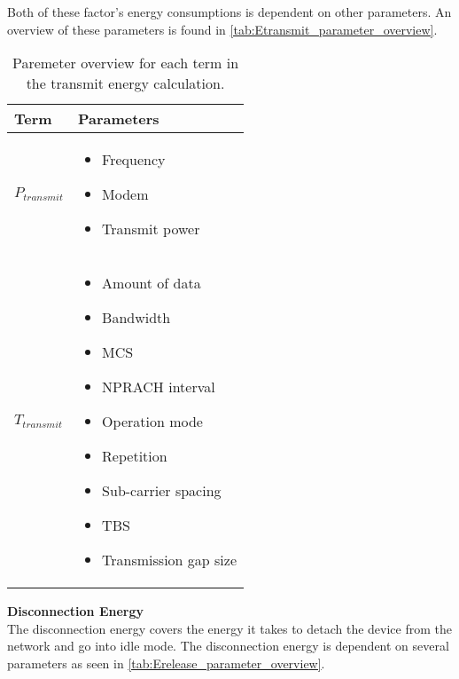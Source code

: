 Both of these factor's energy consumptions is dependent on other parameters. An overview of these parameters is found in \autoref{tab:Etransmit_parameter_overview}.

\begin{table}[H]
\centering
\begin{tabular}{|m{3cm}|m{6cm}|} \hline
\textbf{Term} & \textbf{Parameters} \\ \hline
$P_{transmit}$ & \begin{itemize}
\item Frequency
\item Modem
\item Transmit power 
\end{itemize} \\ \hline
$T_{transmit}$ & \begin{itemize}
\item Amount of data
\item Bandwidth
\item \gls{MCS}
\item NPRACH interval
\item Operation mode
\item Repetition
\item Sub-carrier spacing
\item \gls{TBS}
\item Transmission gap size
\end{itemize} \\ \hline
\end{tabular}
\caption{Paremeter overview for each term in the transmit energy calculation.}
\label{tab:Etransmit_parameter_overview}
\end{table}


\textbf{Disconnection Energy}\\
The disconnection energy covers the energy it takes to detach the device from the network and go into idle mode. The disconnection energy is dependent on several parameters as seen in \autoref{tab:Erelease_parameter_overview}.

